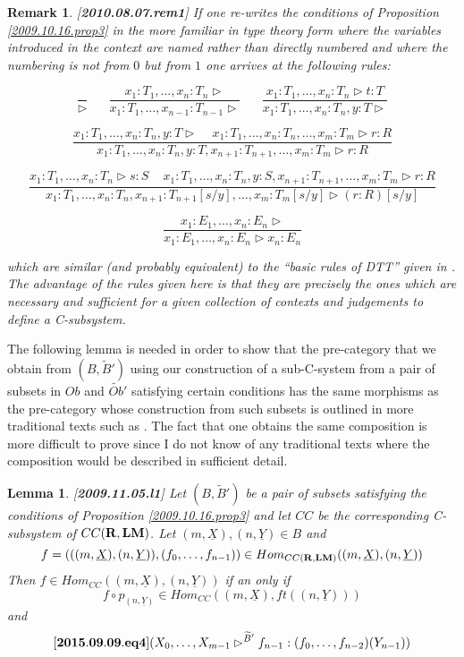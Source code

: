 \documentclass[11pt]{article}
\newenvironment{eq}{\begin{equation}}{\end{equation}}
\newtheorem{lemma}[proposition]{Lemma}
\newtheorem{remark}[proposition]{Remark}
\newcommand{\llabel}[1]{\label{#1}[{\bf #1}]}
\newcommand{\rr}{{\bf R}}
\newcommand{\lm}{{\bf LM}}
\newcommand{\uu}{\underline}
\newcommand{\wt}{\widetilde}
\begin{document}
%
\begin{remark}\rm\llabel{2010.08.07.rem1} If one re-writes the conditions of Proposition \ref{2009.10.16.prop3} in the more familiar in type theory form where the variables introduced in the context are named rather than directly numbered and where the numbering is not from $0$ but from $1$ one arrives at the following rules:
%
\begin{center}
%
$$\frac{}{\rhd}\,\,\,\,\,\,\,\,\,\,
\frac{x_1:T_1,\dots,x_n:T_n\rhd}{x_1:T_1,\dots,x_{n-1}:T_{n-1}\rhd} \,\,\,\,\,\,\,\,\,\, 
\frac{x_1:T_1,\dots,x_n:T_n\rhd t:T}{x_1:T_1,\dots,x_n:T_n, y:T\rhd}$$

$$\frac{x_1:T_1,\dots,x_n:T_n, y:T\rhd\,\,\,\,\,\,\,x_1:T_1,\dots,x_n:T_n,\dots, x_m:T_m\rhd r:R}{x_1:T_1,\dots,x_n:T_n, y:T, x_{n+1}:T_{n+1},\dots,x_m:T_m\rhd r:R}$$

$$\frac{x_1:T_1,\dots,x_n:T_n\rhd s:S\,\,\,\,\,\,\,x_1:T_1,\dots,x_n:T_n,y:S,x_{n+1}:T_{n+1},\dots,x_m:T_m \rhd r:R}
{x_1:T_1,\dots,x_n:T_n,x_{n+1}:T_{n+1}[s/y],\dots,x_m:T_m[s/y] \rhd (r:R)[s/y]}$$

$$\frac{x_1:E_1,\dots,x_n:E_n\rhd}{x_1:E_1,\dots,x_n:E_n\rhd x_n:E_n}$$

\end{center}
%
which are similar (and probably equivalent) to the ``basic rules of DTT'' given in \cite[p.585]{Jacobs1}. The advantage of the rules given here is that they are precisely the ones which are necessary and sufficient for a given collection of contexts and judgements to define a C-subsystem.
\end{remark}
%
The following lemma is needed in order to show that the pre-category that we obtain from $(B,\wt{B}')$ using our construction of a sub-C-system from a pair of subsets in $Ob$ and $\wt{Ob}'$ satisfying certain conditions has the same morphisms as the pre-category whose construction from such subsets is outlined  in more traditional texts such as \cite{MH1995}. The fact that one obtains the same composition is more difficult to prove since I do not know of any traditional texts where the composition would be described in sufficient detail. 
%
\begin{lemma}
\llabel{2009.11.05.l1}
Let $(B,\wt{B}')$ be a pair of subsets satisfying the conditions of Proposition \ref{2009.10.16.prop3} and let $CC$ be the corresponding C-subsystem of $CC(\rr,\lm)$. Let $(m,\uu{X}),(n,\uu{Y})\in B$ and 
%
$$f=(((m,\uu{X}),(n,\uu{Y})),(f_0,\dots,f_{n-1}))\in Hom_{CC(\rr,\lm)}((m,\uu{X}),(n,\uu{Y}))$$
%
Then $f\in Hom_{CC}((m,\uu{X}), (n,\uu{Y}))$ if an only if 
%
$$f\circ p_{(n,\uu{Y})}\in Hom_{CC}((m,\uu{X}), ft((n,\uu{Y})))$$
%
and 
%
\begin{eq}\llabel{2015.09.09.eq4}
(X_0,\dots,X_{m-1}\rhd^{\wt{B}'} f_{n-1} : (f_0,\dots,f_{n-2})(Y_{n-1}))
\end{eq}
%
\end{lemma}
\end{document}
